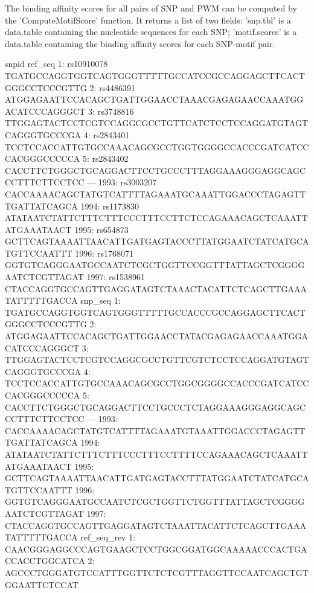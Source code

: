 \documentclass[a4paper,10pt]{article}
\begin{document}
The binding affinity scores for all pairs of SNP and PWM can be computed by the 'ComputeMotifScore' function. It returns a list of two fields: 'snp.tbl' is a data.table containing the nucleotide sequences for each SNP; 'motif.scores' is a data.table containing the binding affinity scores for each SNP-motif pair.

\begin{Schunk}
\begin{Soutput}
           snpid                                                       ref_seq
   1: rs10910078 TGATGCCAGGTGGTCAGTGGGTTTTTGCCATCCGCCAGGAGCTTCACTGGGCCTCCCGTTG
   2:  rs4486391 ATGGAGAATTCCACAGCTGATTGGAACCTAAACGAGAGAACCAAATGGACATCCCAGGGCT
   3:  rs3748816 TTGGAGTACTCCTCGTCCAGGCGCCTGTTCATCTCCTCCAGGATGTAGTCAGGGTGCCCGA
   4:  rs2843401 TCCTCCACCATTGTGCCAAACAGCGCCTGGTGGGGCCACCCGATCATCCCACGGGCCCCCA
   5:  rs2843402 CACCTTCTGGGCTGCAGGACTTCCTGCCCTTTAGGAAAGGGAGGCAGCCCTTTCTTCCTCC
  ---                                                                         
1993:  rs3003207 CACCAAAACAGCTATGTCATTTTAGAAATGCAAATTGGACCCTAGAGTTTGATTATCAGCA
1994:  rs1173830 ATATAATCTATTCTTTCTTTCCCTTTCCTTCTCCAGAAACAGCTCAAATTATGAAATAACT
1995:   rs654873 GCTTCAGTAAAATTAACATTGATGAGTACCCTTATGGAATCTATCATGCATGTTCCAATTT
1996:  rs1768071 GGTGTCAGGGAATGCCAATCTCGCTGGTTCCGGTTTATTAGCTCGGGGAATCTCGTTAGAT
1997:  rs1538961 CTACCAGGTGCCAGTTGAGGATAGTCTAAACTACATTCTCAGCTTGAAATATTTTTGACCA
                                                            snp_seq
   1: TGATGCCAGGTGGTCAGTGGGTTTTTGCCACCCGCCAGGAGCTTCACTGGGCCTCCCGTTG
   2: ATGGAGAATTCCACAGCTGATTGGAACCTATACGAGAGAACCAAATGGACATCCCAGGGCT
   3: TTGGAGTACTCCTCGTCCAGGCGCCTGTTCGTCTCCTCCAGGATGTAGTCAGGGTGCCCGA
   4: TCCTCCACCATTGTGCCAAACAGCGCCTGGCGGGGCCACCCGATCATCCCACGGGCCCCCA
   5: CACCTTCTGGGCTGCAGGACTTCCTGCCCTCTAGGAAAGGGAGGCAGCCCTTTCTTCCTCC
  ---                                                              
1993: CACCAAAACAGCTATGTCATTTTAGAAATGTAAATTGGACCCTAGAGTTTGATTATCAGCA
1994: ATATAATCTATTCTTTCTTTCCCTTTCCTTTTCCAGAAACAGCTCAAATTATGAAATAACT
1995: GCTTCAGTAAAATTAACATTGATGAGTACCTTTATGGAATCTATCATGCATGTTCCAATTT
1996: GGTGTCAGGGAATGCCAATCTCGCTGGTTCTGGTTTATTAGCTCGGGGAATCTCGTTAGAT
1997: CTACCAGGTGCCAGTTGAGGATAGTCTAAATTACATTCTCAGCTTGAAATATTTTTGACCA
                                                        ref_seq_rev
   1: CAACGGGAGGCCCAGTGAAGCTCCTGGCGGATGGCAAAAACCCACTGACCACCTGGCATCA
   2: AGCCCTGGGATGTCCATTTGGTTCTCTCGTTTAGGTTCCAATCAGCTGTGGAATTCTCCAT

\end{Soutput}
\end{Schunk}
\end{document}
